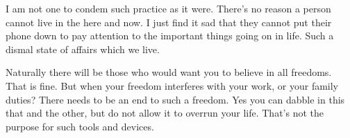 I am not one to condem such practice as it were. There's no reason a person
cannot live in the here and now. I just find it sad that they cannot put their
phone down to pay attention to the important things going on in life. Such a
dismal state of affairs which we live.

Naturally there will be those who would want you to believe in all freedoms.
That is fine. But when your freedom interferes with your work, or your family
duties? There needs to be an end to such a freedom. Yes you can dabble in this
that and the other, but do not allow it to overrun your life. That's not the
purpose for such tools and devices.
